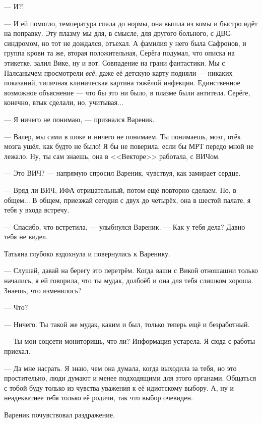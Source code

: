 --- И?!

--- И ей помогло, температура спала до нормы, она вышла из комы и быстро идёт на поправку.
Эту плазму мы для, в смысле, для другого больного, с ДВС-синдромом, но тот не дождался, отъехал.
А фамилия у него была Сафронов, и группа крови та же, вторая положительная, Серёга подумал, что описка на этикетке, залил Вике, ну и вот.
Совпадение на грани фантастики.
Мы с Палсанычем просмотрели \emph{всё}, даже её детскую карту подняли --- никаких показаний, типичная клиническая картина тяжёлой инфекции.
Единственное возможное объяснение --- что бы это ни было, в плазме были антитела.
Серёге, конечно, втык сделали, но, учитывая...

--- Я ничего не понимаю, --- признался Вареник.

--- Валер, мы сами в шоке и ничего не понимаем.
Ты понимаешь, мозг, отёк мозга ушёл, как будто не было!
Я бы не поверила, если бы МРТ передо мной не лежало.
Ну, ты сам знаешь, она в <<Векторе>> работала, с ВИЧом.

--- Это ВИЧ? --- напрямую спросил Вареник, чувствуя, как замирает сердце.

--- Вряд ли ВИЧ, ИФА отрицательный, потом ещё повторно сделаем.
Но, в общем...
В общем, приезжай сегодня с двух до четырёх, она в шестой палате, я тебя у входа встречу.

\asterism

\textspace

--- Спасибо, что встретила, --- улыбнулся Вареник.
--- Как у тебя дела?
Давно тебя не видел.

Татьяна глубоко вздохнула и повернулась к Варенику.

--- Слушай, давай на берегу это перетрём.
Когда ваши с Викой отношашни только начались, я ей говорила, что ты мудак, долбоёб и она для тебя слишком хороша.
Знаешь, что изменилось?

--- Что?

--- Ничего.
Ты такой же мудак, каким и был, только теперь ещё и безработный.

--- Ты мои соцсети мониторишь, что ли?
Информация устарела.
Я сюда с работы приехал.

--- Да мне насрать.
Я знаю, чем она думала, когда выходила за тебя, но это простительно, люди думают и менее подходящими для этого органами.
Общаться с тобой буду только из чувства уважения к её идиотскому выбору.
А, ну и неадекватнее тебя только её родичи, так что выбор очевиден.

Вареник почувствовал раздражение.

